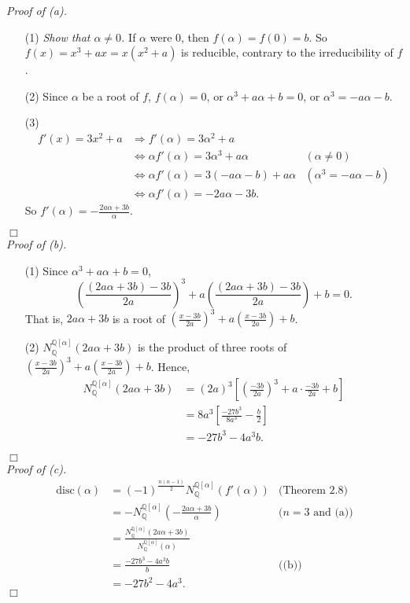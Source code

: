 \documentclass{article}
\begin{document}
\emph{Proof of (a).}
\begin{enumerate}
\item[(1)]
\emph{Show that $\alpha \neq 0$.}
If $\alpha$ were $0$, then $f(\alpha) = f(0) = b$.
So $f(x) = x^3+ax = x(x^2+a)$ is reducible, contrary to the irreducibility of $f$.
\item[(2)]
Since $\alpha$ be a root of $f$,
$f(\alpha) = 0$,
or $\alpha^3 + a\alpha + b = 0$,
or $\alpha^3 = -a\alpha-b$.
\item[(3)]
\begin{align*}
f'(x) = 3x^2 + a
&\Longrightarrow
f'(\alpha) = 3\alpha^2 + a \\
&\Longleftrightarrow
\alpha f'(\alpha) = 3\alpha^3 + a\alpha
  &(\alpha \neq 0) \\
&\Longleftrightarrow
\alpha f'(\alpha) = 3(-a\alpha-b) + a\alpha
  &(\alpha^3 = -a\alpha-b) \\
&\Longleftrightarrow
\alpha f'(\alpha) = -2a\alpha-3b.
\end{align*}
So $f'(\alpha) = -\frac{2a\alpha+3b}{\alpha}$.
\end{enumerate}
$\Box$ \\

\emph{Proof of (b).}
\begin{enumerate}
\item[(1)]
Since $\alpha^3 + a\alpha + b = 0$,
$$\left( \frac{(2a\alpha+3b)-3b}{2a} \right)^3
  + a\left( \frac{(2a\alpha+3b)-3b}{2a} \right) + b = 0.$$
That is, $2a\alpha+3b$ is a root of
$\left( \frac{x-3b}{2a} \right)^3 + a\left( \frac{x-3b}{2a} \right) + b$.
\item[(2)]
$N_{\mathbb{Q}}^{\mathbb{Q}[\alpha]}(2a\alpha+3b)$ is the product of three roots of
$\left( \frac{x-3b}{2a} \right)^3 + a\left( \frac{x-3b}{2a} \right) + b$.
Hence,
\begin{align*}
N_{\mathbb{Q}}^{\mathbb{Q}[\alpha]}(2a\alpha+3b)
&= (2a)^3\left[ \left(\frac{-3b}{2a}\right)^3 + a \cdot \frac{-3b}{2a} + b \right] \\
&= 8a^3\left[ \frac{-27b^3}{8a^3} - \frac{b}{2} \right] \\
&= -27b^3-4a^3b.
\end{align*}
\end{enumerate}
$\Box$ \\

\emph{Proof of (c).}
\begin{align*}
\text{disc}(\alpha)
&= (-1)^{\frac{n(n-1)}{2}} N_{\mathbb{Q}}^{\mathbb{Q}[\alpha]}(f'(\alpha))
  &\text{(Theorem 2.8)} \\
&= - N_{\mathbb{Q}}^{\mathbb{Q}[\alpha]}\left( -\frac{2a\alpha+3b}{\alpha} \right)
  &\text{($n=3$ and (a))} \\
&= \frac{N_{\mathbb{Q}}^{\mathbb{Q}[\alpha]}(2a\alpha+3b)}
  {N_{\mathbb{Q}}^{\mathbb{Q}[\alpha]}(\alpha)} \\
&= \frac{-27b^3-4a^3b}{b}
  &\text{((b))} \\
&= -27b^2-4a^3.
\end{align*}
$\Box$ \\
\end{document}
